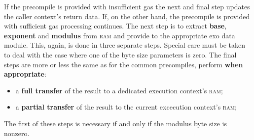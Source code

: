 If the precompile is provided with insufficient gas the next and final step updates the caller context's return data.
If, on the other hand, the precompile is provided with sufficient gas processing continues.
The next step is to extract \textbf{base}, \textbf{exponent} and \textbf{modulus} from \textsc{ram} and provide to the appropriate exo data module.
This, again, is done in three separate steps.
Special care must be taken to deal with the case where one of the byte size parameters is zero.
The final steps are more or less the same as for the common precompiles, perform \textbf{when appropriate}:
\begin{itemize}
	\item a \textbf{full transfer} of the result to a dedicated execution context's \textsc{ram};
	\item a \textbf{partial transfer} of the result to the current excecution context's \textsc{ram};
\end{itemize}
The first of these steps is necessary if and only if the modulus byte size is nonzero.
